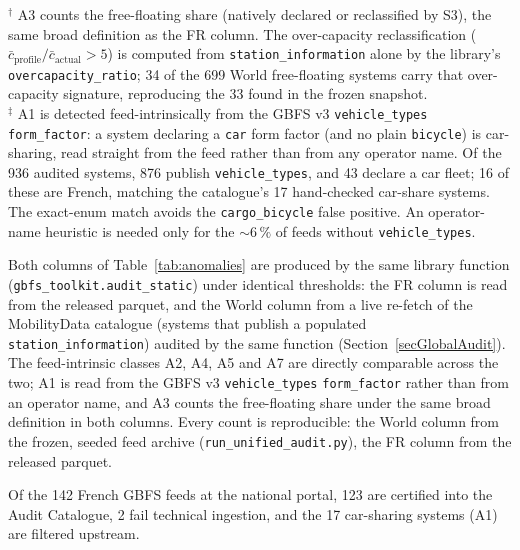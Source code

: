 \documentclass[11pt,a4paper]{article}
\begin{document}
\begin{table}[!htbp]
\vspace{0.3em}
{\footnotesize $^\dagger$ A3 counts the free-floating share (natively declared
or reclassified by S3), the same broad definition as the FR column. The
over-capacity reclassification ($\bar c_{\text{profile}}/\bar c_{\text{actual}}
> 5$) is computed from \texttt{station\_information} alone by the library's
\texttt{overcapacity\_ratio}; 34 of the 699 World free-floating systems carry
that over-capacity signature, reproducing the 33 found in the frozen snapshot.\\
$^\ddagger$ A1 is detected feed-intrinsically from the GBFS v3
\texttt{vehicle\_types} \texttt{form\_factor}: a system declaring a
\texttt{car} form factor (and no plain \texttt{bicycle}) is car-sharing,
read straight from the feed rather than from any operator name. Of the 936
audited systems, 876 publish \texttt{vehicle\_types}, and 43 declare a car
fleet; 16 of these are French, matching the catalogue's 17 hand-checked
car-share systems. The exact-enum match avoids the \texttt{cargo\_bicycle}
false positive. An operator-name heuristic is needed only for the
$\sim 6\,\%$ of feeds without \texttt{vehicle\_types}.}
\end{table}

Both columns of Table~\ref{tab:anomalies} are produced by the same library
function (\texttt{gbfs\_toolkit.audit\_static}) under identical thresholds:
the FR column is read from the released parquet, and the World column from a
live re-fetch of the MobilityData catalogue (systems that publish a
populated \texttt{station\_information}) audited by the same function
(Section~\ref{secGlobalAudit}). The feed-intrinsic classes A2, A4, A5 and A7
are directly comparable across the two; A1 is read from the GBFS v3
\texttt{vehicle\_types} \texttt{form\_factor} rather than from an operator
name, and A3 counts the free-floating share under the same broad definition
in both columns. Every count is reproducible: the World column from the
frozen, seeded feed archive (\texttt{run\_unified\_audit.py}), the FR column
from the released parquet.

Of the 142 French GBFS feeds at the national portal, 123 are certified
into the Audit Catalogue, 2 fail technical ingestion, and the 17
car-sharing systems (A1) are filtered upstream.
\end{document}
